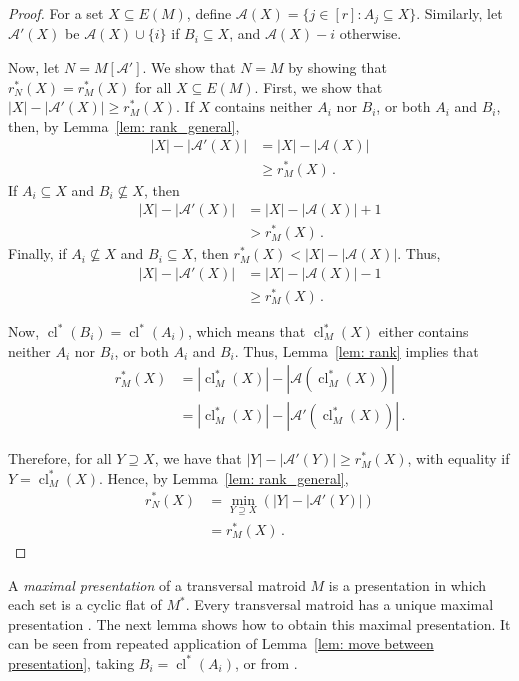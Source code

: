 \documentclass[11pt, reqno]{amsart}
\DeclareMathOperator{\cl}{cl}
\begin{document}
\begin{proof}
For a set $X \subseteq E(M)$, define $\mathcal A(X) = \{j \in [r] : A_j \subseteq X\}$. Similarly, let $\mathcal A'(X)$ be $\mathcal A(X) \cup \{i\}$ if $B_i \subseteq X$, and $\mathcal A(X) - i$ otherwise.	
	
Now, let $N = M[\mathcal A']$. We show that $N = M$ by showing that $r^*_N(X) = r^*_M(X)$ for all $X \subseteq E(M)$. First, we show that $|X| - |\mathcal A'(X)| \geq r^*_M(X)$. If $X$ contains neither $A_i$ nor $B_i$, or both $A_i$ and $B_i$, then, by Lemma~\ref{lem: rank_general},
\begin{align*}
	|X| - |\mathcal A'(X)| &= |X| - |\mathcal A(X)| \\
	&\geq r^*_M(X) \,.
\end{align*}
If $A_i \subseteq X$ and $B_i \not\subseteq X$, then
\begin{align*}
	|X| - |\mathcal A'(X)| &= |X| - |\mathcal A(X)| + 1 \\
	&> r^*_M(X) \,.
\end{align*}
Finally, if $A_i \not\subseteq X$ and $B_i \subseteq X$, then $r^*_M(X) < |X| - |\mathcal A(X)|$. Thus,
\begin{align*}
	|X| - |\mathcal A'(X)| &= |X| - |\mathcal A(X)| - 1 \\
	&\geq r^*_M(X) \,.
\end{align*}

Now, $\cl^*(B_i) = \cl^*(A_i)$, which means that $\cl^*_M(X)$ either contains neither $A_i$ nor $B_i$, or both $A_i$ and $B_i$. Thus, Lemma~\ref{lem: rank} implies that
\begin{align*}
	r^*_M(X) &= |\cl^*_M(X)| - |\mathcal A(\cl^*_M(X))| \\
	&= |\cl^*_M(X)| - |\mathcal A'(\cl^*_M(X))| \,.
\end{align*}

Therefore, for all $Y \supseteq X$, we have that $|Y| - |\mathcal A'(Y)| \geq r_M^*(X)$, with equality if $Y = \cl^*_M(X)$. Hence, by Lemma~\ref{lem: rank_general}, 
\begin{align*}
r_N^*(X) &= \min_{Y \supseteq X}\left(|Y| - |\mathcal A'(Y)|\right) \\
&= r^*_M(X) \,.
\end{align*}
\end{proof}

A \emph{maximal presentation} of a transversal matroid $M$ is a presentation in which each set is a cyclic flat of $M^*$. Every transversal matroid has a unique maximal presentation \cite{bon72}. The next lemma shows how to obtain this maximal presentation. It can be seen from repeated application of Lemma~\ref{lem: move between presentation}, taking $B_i = \cl^*(A_i)$, or from \cite[Lemma 3]{bon72}.
\end{document}

